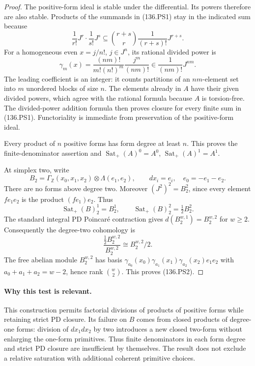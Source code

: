 \begin{proof}
The positive-form ideal is stable under the differential. Its powers
therefore are also stable. Products of the summands in (136.PS1) stay in
the indicated sum because
\[
 \frac1{r!}J^r\cdot\frac1{s!}J^s
     \subseteq \binom{r+s}{r}\frac1{(r+s)!}J^{r+s}.
\]
For a homogeneous even \(x=j/n!\), \(j\in J^n\), its rational divided power
is
\[
 \gamma_m(x)=
 \frac{(nm)!}{m!(n!)^m}\frac{j^m}{(nm)!}
       \in\frac1{(nm)!}J^{nm}.
\]
The leading coefficient is an integer: it counts partitions of an
\(nm\)-element set into \(m\) unordered blocks of size \(n\).
The elements already in \(A\) have their given divided powers, which
agree with the rational formula because \(A\) is torsion-free.
The divided-power addition formula then proves closure for every
finite sum in (136.PS1). Functoriality is immediate from preservation of
the positive-form ideal.

Every product of \(n\) positive forms has form degree at least \(n\).
This proves the finite-denominator assertion and
\(\operatorname{Sat}_{+}(A)^0=A^0\),
\(\operatorname{Sat}_{+}(A)^1=A^1\).

At simplex two, write
\[
 B_2=\Gamma_{\mathbb Z}(x_0,x_1,x_2)
                 \otimes\Lambda(e_1,e_2),
 \qquad dx_i=e_i,\quad e_0=-e_1-e_2 .
\]
There are no forms above degree two. Moreover
\((J^2)^2=B_2^2\), since every element \(f e_1e_2\) is the
product \((f e_1)e_2\). Thus
\[
 \operatorname{Sat}_{+}(B)_2^1=B_2^1,\qquad
 \operatorname{Sat}_{+}(B)_2^2=\tfrac12 B_2^2 .
\]
The standard integral PD Poincaré contraction gives
\(d(B_2^{w,1})=B_2^{w,2}\) for \(w\geq2\).
Consequently the degree-two cohomology is
\[
  \frac{\tfrac12 B_2^{w,2}}{B_2^{w,2}}
       \cong B_2^{w,2}/2 .
\]
The free abelian module \(B_2^{w,2}\) has basis
\(\gamma_{a_0}(x_0)\gamma_{a_1}(x_1)\gamma_{a_2}(x_2)e_1e_2\)
with \(a_0+a_1+a_2=w-2\), hence rank \(\binom w2\). This proves (136.PS2).
\end{proof}

\paragraph{Why this test is relevant.}
This construction permits factorial divisions of products of positive
forms while retaining strict PD closure. Its failure on \(B\) comes
from closed products of degree-one forms:
division of \(dx_1dx_2\) by two introduces a new closed two-form without
enlarging the one-form primitives. Thus finite denominators in each form
degree and strict PD closure are insufficient by themselves. The result
does not exclude a relative saturation with additional coherent
primitive choices.

